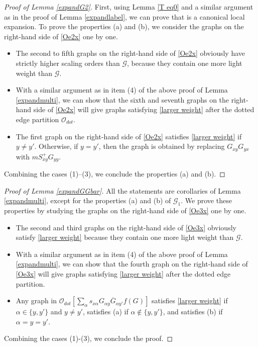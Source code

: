 \documentclass{article}
\newcommand{\1}{\mathds{1}}
\numberwithin{equation}{section}
\newcommand{\al}{\alpha}
\renewcommand{\cal}{\mathcal}
\theoremstyle{plain} %
\theoremstyle{remark}
\begin{document}
\begin{proof} [Proof of Lemma \ref{expandG2}]
First, using Lemma \ref{T eq0} and a similar argument as in the proof of Lemma \ref{expandlabel}, we can prove that \smash{${\cal O}_{GG}^{(x)}[\cal G]$} is a canonical local expansion. To prove the properties (a) and (b), we consider the graphs on the right-hand side of \eqref{Oe2x} one by one. 
 
 \begin{itemize}
 \item[(1)] The second to fifth graphs on the right-hand side of \eqref{Oe2x} obviously have strictly higher scaling orders than $\cal G$, because they contain one more light weight than $\cal G$. 
 
 \item[(2)]  With a similar argument as in item (4) of the above proof of Lemma \ref{expandmulti}, we can show that the sixth and seventh graphs on the right-hand side of \eqref{Oe2x} will give graphs satisfying \eqref{larger weight} after the dotted edge partition $\cal O_{dot}$.

\item[(3)] The first graph on the right-hand side of \eqref{Oe2x} satisfies \eqref{larger weight} if $y\ne y'$. Otherwise, if $y=y'$, then the graph is obtained by replacing $G_{xy}   G_{yx }$ with $m S^+_{xy}G_{yy}$. 
\end{itemize}
Combining the cases (1)--(3), we conclude the properties (a) and (b).
\end{proof} 


\begin{proof}[Proof of Lemma \ref{expandGGbar}] 
All the statements are corollaries of Lemma \ref{expandmulti}, except for the properties (a) and (b) of $\cal G_1$. We prove these properties by studying the graphs on the right-hand side of \eqref{Oe3x} one by one. 
 \begin{itemize}
 \item[(1)] The second and third graphs on the right-hand side of \eqref{Oe3x} obviously satisfy \eqref{larger weight} because they contain one more light weight than $\cal G$. 
 
\item[(2)] With a similar argument as in item (4) of the above proof of  Lemma \ref{expandmulti}, we can show that the fourth graph on the right-hand side of \eqref{Oe3x} will give graphs satisfying \eqref{larger weight} after the dotted edge partition.

\item[(3)] Any graph in $\cal O_{dot}[\sum_\al s_{x\al }G_{\al y} \overline G_{\al y'} f(G)]$ satisfies \eqref{larger weight} if $\al \in \{y,y'\}$ and $y\ne y'$, satisfies (a) if $\al \notin \{y,y'\}$, and satisfies (b) if $\al = y = y'$. 
\end{itemize}
Combining the cases (1)-(3), we conclude the proof.
\end{proof} 
\end{document}
